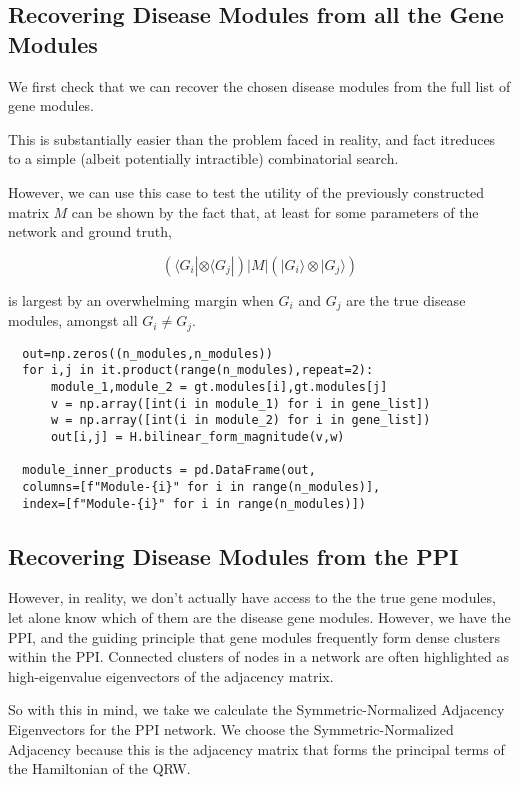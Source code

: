 \documentclass[a4paper,english]{article}
\begin{document}
  
\subsection{ Recovering Disease Modules from all the Gene Modules}
  
  We first check that we can recover the chosen disease modules from the full list of gene modules. 
  
This is substantially easier than the problem faced in reality, and fact itreduces to a simple (albeit potentially intractible) combinatorial search. 
  
  However, we can use this case to test the utility of the previously constructed matrix $M$ can be shown by the fact that, at least for some parameters of the network and ground truth,
  
  $$ (\langle G_i|\otimes \langle G_j |)
   | M |  (|G_i\rangle \otimes | G_j \rangle)
  $$
  
  is largest by an overwhelming margin when $G_i$ and $G_j$ are the true disease modules, amongst all $G_i \neq G_j$.
  

\begin{lstlisting}
  out=np.zeros((n_modules,n_modules))
  for i,j in it.product(range(n_modules),repeat=2):
      module_1,module_2 = gt.modules[i],gt.modules[j]
      v = np.array([int(i in module_1) for i in gene_list])
      w = np.array([int(i in module_2) for i in gene_list])
      out[i,j] = H.bilinear_form_magnitude(v,w)
      
  module_inner_products = pd.DataFrame(out,
  columns=[f"Module-{i}" for i in range(n_modules)],
  index=[f"Module-{i}" for i in range(n_modules)]) 
\end{lstlisting}

  
  
  \subsection{ Recovering Disease Modules from the PPI}
  
  However, in reality, we don't actually have access to the the true gene modules, let alone know
  which of them are the disease gene modules. However, we have the PPI, and the guiding principle that gene modules frequently form dense clusters within the PPI. Connected clusters of nodes in a network are often highlighted 
  as high-eigenvalue eigenvectors of the adjacency matrix. 
  
  
  So with this in mind, we take we calculate the Symmetric-Normalized Adjacency Eigenvectors for the PPI network. We choose the Symmetric-Normalized Adjacency because this is the adjacency matrix that forms the principal terms of the Hamiltonian of the QRW.
  
\end{document}
